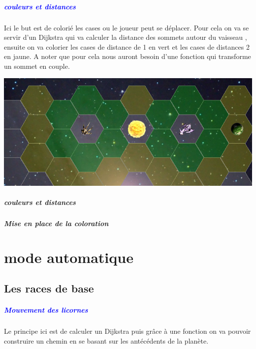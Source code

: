 \documentclass{report}
\begin{document}
       
      \paragraph{\textcolor{blue} {couleurs et distances}} 
      Ici le but est de colorié les cases ou le joueur peut se déplacer. 
      Pour cela on va  se servir d'un Dijkstra qui va calculer la distance des sommets autour du vaisseau , ensuite on va colorier les cases de distance de 1 en vert et les cases de distances 2 en jaune. A noter que pour cela nous auront besoin d'une fonction qui transforme un sommet en couple. 
       
        \begin{center} 
      
          \includegraphics[scale=0.30]{Images/colarationMouvement.png} 
     
      \end{center} 
       
      
			\paragraph{couleurs et distances}
			\paragraph{Mise en place de la coloration}
			
			
	\chapter{mode automatique}
		\section{Les races de base}
			\paragraph{\textcolor{blue}{Mouvement des licornes}}
			Le principe ici est de calculer un Dijkstra puis grâce à une fonction on va pouvoir construire un chemin en se basant sur les antécédents de la planète.
\end{document}
